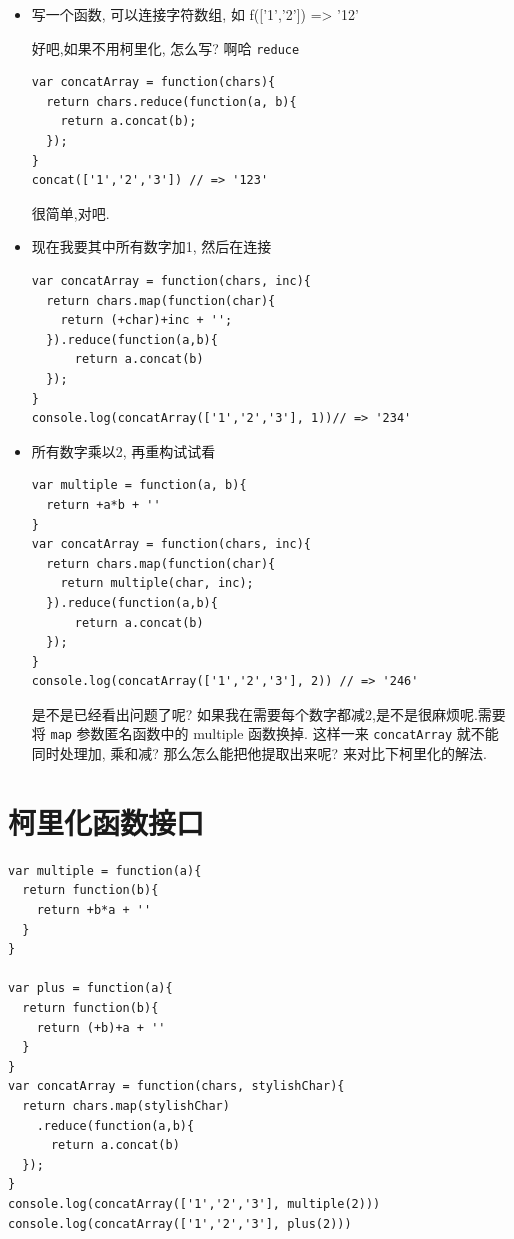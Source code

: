 \documentclass[a5paper]{book}
\begin{document}
\begin{itemize}
\item 写一个函数, 可以连接字符数组, 如 f(['1','2']) => '12'
\label{sec:orgheadline13}

好吧,如果不用柯里化, 怎么写? 啊哈 \texttt{reduce}

\begin{verbatim}
var concatArray = function(chars){
  return chars.reduce(function(a, b){
    return a.concat(b);
  });
}
concat(['1','2','3']) // => '123'
\end{verbatim}

很简单,对吧.

\item 现在我要其中所有数字加1, 然后在连接
\label{sec:orgheadline14}

\begin{verbatim}
var concatArray = function(chars, inc){
  return chars.map(function(char){
    return (+char)+inc + '';
  }).reduce(function(a,b){
      return a.concat(b)
  });
}
console.log(concatArray(['1','2','3'], 1))// => '234'
\end{verbatim}

\item 所有数字乘以2, 再重构试试看
\label{sec:orgheadline15}

\begin{verbatim}
var multiple = function(a, b){
  return +a*b + ''
}
var concatArray = function(chars, inc){
  return chars.map(function(char){
    return multiple(char, inc);
  }).reduce(function(a,b){
      return a.concat(b)
  });
}
console.log(concatArray(['1','2','3'], 2)) // => '246'
\end{verbatim}

是不是已经看出问题了呢?
如果我在需要每个数字都减2,是不是很麻烦呢.需要将 \texttt{map} 参数匿名函数中的
multiple 函数换掉. 这样一来 \texttt{concatArray} 就不能同时处理加, 乘和减?
那么怎么能把他提取出来呢? 来对比下柯里化的解法.
\end{itemize}

\section{柯里化函数接口}
\label{sec:orgheadline17}

\begin{verbatim}
var multiple = function(a){
  return function(b){
    return +b*a + ''
  }
}

var plus = function(a){
  return function(b){
    return (+b)+a + ''
  }
}
var concatArray = function(chars, stylishChar){
  return chars.map(stylishChar)
    .reduce(function(a,b){
      return a.concat(b)
  });
}
console.log(concatArray(['1','2','3'], multiple(2)))
console.log(concatArray(['1','2','3'], plus(2)))
\end{verbatim}
\end{document}
